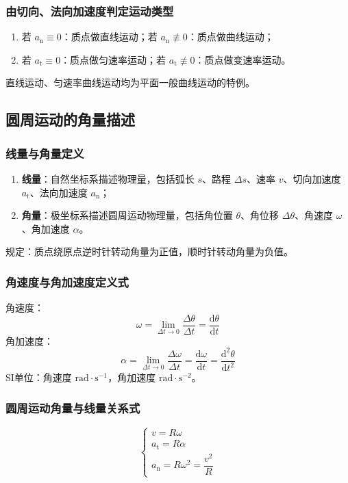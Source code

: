    \subsubsection{由切向、法向加速度判定运动类型}
    \begin{enumerate}
        \item 若 $a_\mathrm{n} \equiv 0$：质点做直线运动；若 $a_\mathrm{n} \not\equiv 0$：质点做曲线运动；
        \item 若 $a_\mathrm{t} \equiv 0$：质点做匀速率运动；若 $a_\mathrm{t} \not\equiv 0$：质点做变速率运动。
    \end{enumerate}
    直线运动、匀速率曲线运动均为平面一般曲线运动的特例。

    \subsection{圆周运动的角量描述}
    \subsubsection{线量与角量定义}
    \begin{enumerate}
        \item \textbf{线量}：自然坐标系描述物理量，包括弧长 $s$、路程 $\Delta s$、速率 $v$、切向加速度 $a_\mathrm{t}$、法向加速度 $a_\mathrm{n}$；
        \item \textbf{角量}：极坐标系描述圆周运动物理量，包括角位置 $\theta$、角位移 $\Delta\theta$、角速度 $\omega$、角加速度 $\alpha$。
    \end{enumerate}
    规定：质点绕原点逆时针转动角量为正值，顺时针转动角量为负值。

    \subsubsection{角速度与角加速度定义式}
    角速度：
    \[
    \omega = \lim_{\Delta t \to 0}\frac{\Delta\theta}{\Delta t} = \frac{\mathrm{d}\theta}{\mathrm{d}t}
    \]
    角加速度：
    \[
    \alpha = \lim_{\Delta t \to 0}\frac{\Delta\omega}{\Delta t} = \frac{\mathrm{d}\omega}{\mathrm{d}t} = \frac{\mathrm{d}^2\theta}{\mathrm{d}t^2}
    \]
    SI单位：角速度 $\mathrm{rad\cdot s^{-1}}$，角加速度 $\mathrm{rad\cdot s^{-2}}$。

    \subsubsection{圆周运动角量与线量关系式}
    \[
    \begin{cases}
    v = R\omega \\
    a_\mathrm{t} = R\alpha \\
    a_\mathrm{n} = R\omega^2 = \dfrac{v^2}{R}
    \end{cases}
    \]

